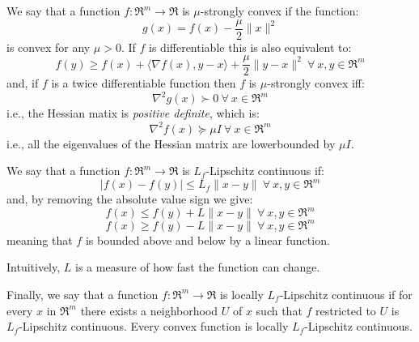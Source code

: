 \begin{definition} \label{def:strong_convexity}
We say that a function $f: \Re^m \rightarrow \Re$ is $\mu$-strongly convex if the function:
$$
g(x) = f(x) - \frac{\mu}{2} \| x \|^2
$$
is convex for any $\mu > 0$. 
If $f$ is differentiable this is also equivalent to:
$$
f(y) \geq f(x) + \langle \nabla f(x), y - x \rangle + \frac{\mu}{2} \| y - x \|^2 \ \forall \ x, y \in \Re^m
$$
and, if $f$ is a twice differentiable function then $f$ is $\mu$-strongly convex iff:
$$
\nabla^2 g(x) \succ 0 \ \forall \ x \in \Re^m
$$
i.e., the Hessian matix is \emph{positive definite}, which is:
$$
\nabla^2 f(x) \succeq \mu I \ \forall \ x \in \Re^m
$$
i.e., all the eigenvalues of the Hessian matrix are lowerbounded by $\mu I$.
\end{definition}


\begin{definition} \label{def:l_f_lipschitz_continuity}
We say that a function $f: \Re^m \rightarrow \Re$ is $L_f$-Lipschitz continuous if:
$$
| f(x) - f(y) | \leq L_f \| x - y \| \ \forall \ x, y \in \Re^m
$$
and, by removing the absolute value sign we give:
$$
f(x) \leq f(y) + L \| x - y \| \ \forall \ x, y \in \Re^m
$$
$$
f(x) \geq f(y) - L \| x - y \| \ \forall \ x, y \in \Re^m
$$
meaning that $f$ is bounded above and below by a linear function.

Intuitively, $L$ is a measure of how fast the function can change.

Finally, we say that a function $f: \Re^m \rightarrow \Re$ is locally $L_f$-Lipschitz continuous if for every $x$ in $\Re^m$ there exists a neighborhood $U$ of $x$ such that $f$ restricted to $U$ is $L_f$-Lipschitz continuous.
Every convex function is locally $L_f$-Lipschitz continuous.
\end{definition}


